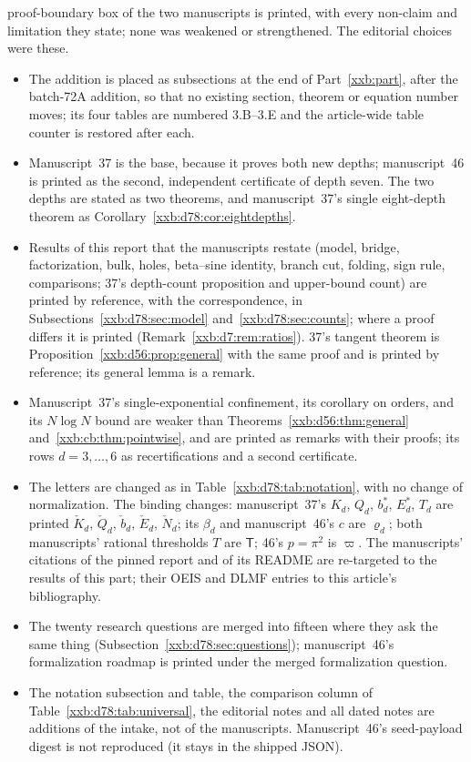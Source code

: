 \documentclass[11pt,a4paper]{article}
\numberwithin{equation}{section}
\theoremstyle{definition}
\theoremstyle{remark}
\theoremstyle{plain}
\begin{document}
proof-boundary box of the two manuscripts is printed, with every non-claim and
limitation they state; none was weakened or strengthened.  The editorial choices
were these.
\begin{itemize}[leftmargin=1.4em,itemsep=1pt]
\item The addition is placed as subsections at the end of Part~\ref{xxb:part},
 after the batch-72A addition, so that no existing section, theorem or equation
 number moves; its four tables are numbered 3.B--3.E and the article-wide table
 counter is restored after each.
\item Manuscript~37 is the base, because it proves both new depths;
 manuscript~46 is printed as the second, independent certificate of depth
 seven.  The two depths are stated as two theorems, and manuscript~37's single
 eight-depth theorem as Corollary~\ref{xxb:d78:cor:eightdepths}.
\item Results of this report that the manuscripts restate (model, bridge,
 factorization, bulk, holes, beta--sine identity, branch cut, folding, sign
 rule, comparisons; 37's depth-count proposition and upper-bound count) are
 printed by reference, with the correspondence, in
 Subsections~\ref{xxb:d78:sec:model} and~\ref{xxb:d78:sec:counts}; where a
 proof differs it is printed (Remark~\ref{xxb:d7:rem:ratios}).  37's tangent
 theorem is Proposition~\ref{xxb:d56:prop:general} with the same proof and is
 printed by reference; its general lemma is a remark.
\item Manuscript~37's single-exponential confinement, its corollary on orders,
 and its $N\log N$ bound are weaker than Theorems~\ref{xxb:d56:thm:general}
 and~\ref{xxb:cb:thm:pointwise}, and are printed as remarks with their proofs;
 its rows $d=3,\ldots,6$ as recertifications and a second certificate.
\item The letters are changed as in Table~\ref{xxb:d78:tab:notation}, with no
 change of normalization.  The binding changes: manuscript~37's $K_d$, $Q_d$,
 $b_d^*$, $E_d^*$, $T_d$ are printed $\check K_d$, $\check Q_d$, $\check b_d$,
 $\check E_d$, $\check N_d$; its $\beta_d$ and manuscript~46's $c$ are
 $\varrho_d$; both manuscripts' rational thresholds $T$ are $\mathsf T$; 46's
 $p=\pi^2$ is $\varpi$.  The manuscripts' citations of the pinned report and
 of its README are re-targeted to the results of this part; their OEIS and
 DLMF entries to this article's bibliography.
\item The twenty research questions are merged into fifteen where they ask the
 same thing (Subsection~\ref{xxb:d78:sec:questions}); manuscript~46's
 formalization roadmap is printed under the merged formalization question.
\item The notation subsection and table, the comparison column of
 Table~\ref{xxb:d78:tab:universal}, the editorial notes and all dated notes are
 additions of the intake, not of the manuscripts.  Manuscript~46's seed-payload
 digest is not reproduced (it stays in the shipped JSON).
\end{itemize}
\end{document}
